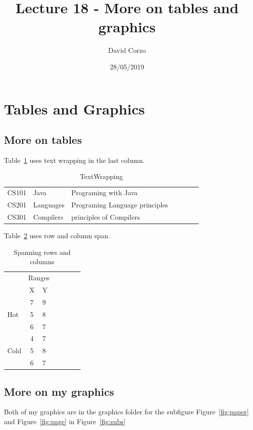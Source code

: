 \documentclass{article}
\title{Lecture 18 - More on tables and graphics}
\author{David Corzo}
\date{28/05/2019}
\begin{document}
\section{Tables and Graphics}
\subsection{More on tables}
Table~\ref{tab:wrapping} uses text wrapping in the last column.
\begin{table}[htbp]
\caption{TextWrapping}
\begin{center}
\begin{tabular}{lllclcl}

    \hline 
    CS101 & Java & Programing with Java \\
    CS201 & Languages & Programing Language principles\\
    CS301 & Compilers & principles of Compilers\\
    \hline

\end{tabular}    
\end{center}   
\label{tab:wrapping} 
\end{table}

Table~\ref{tab:multi} uses row and column span.
\begin{table}[htbp]
\caption{Spanning rows and columns}
\begin{center}
    \begin{tabular}{l c l c l c l}
        \hline
        & \multicolumn{2}{c}{Ranges}\\
        & X & Y\\
        \hline
        \multirow{3}{*}{Hot} & 7 & 9\\
        & 5 & 8\\
        & 6 & 7\\
        \hline
        \multirow{3}{*}{Cold} & 4 & 7\\
        & 5 & 8\\
        & 6 & 7\\

    \end{tabular}
\end{center}
\label{tab:multi}
\end{table}

\subsection{More on my graphics}
Both of my graphics are in the graphics folder for the subfigure Figure~\ref{fig:paper}
and Figure~\ref{fig:page} in Figure~\ref{fig:subs}
\end{document}
